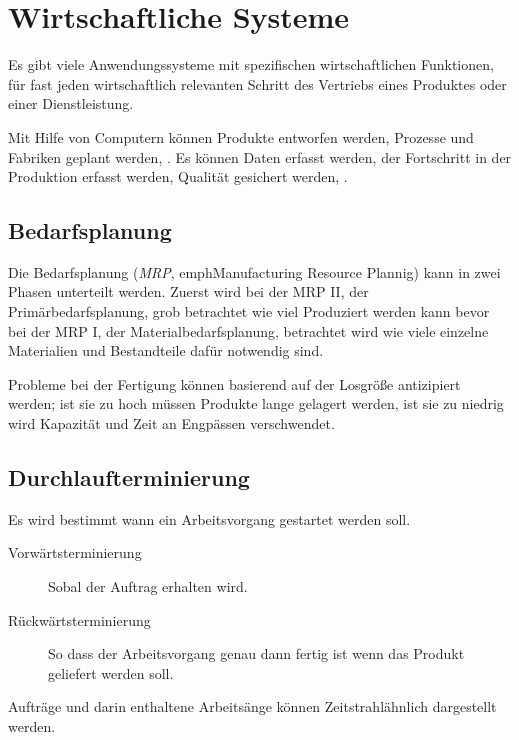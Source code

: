 \documentclass{article}
\begin{document}
\section{Wirtschaftliche Systeme} 
Es gibt viele Anwendungssysteme mit spezifischen wirtschaftlichen Funktionen, für fast jeden wirtschaftlich relevanten Schritt des Vertriebs eines Produktes oder einer Dienstleistung.

Mit Hilfe von Computern können Produkte entworfen werden, Prozesse und Fabriken geplant werden, \etc. Es können Daten erfasst werden, der Fortschritt in der Produktion erfasst werden, Qualität gesichert werden, \etc.

\subsection{Bedarfsplanung}
Die Bedarfsplanung (\emph{MRP}, emph{Manufacturing Resource Plannig}) kann in zwei Phasen unterteilt werden. Zuerst wird bei der MRP II, der Primärbedarfsplanung, grob betrachtet wie viel Produziert werden kann bevor bei der MRP I, der Materialbedarfsplanung, betrachtet wird wie viele einzelne Materialien und Bestandteile dafür notwendig sind.

Probleme bei der Fertigung können basierend auf der Losgröße antizipiert werden; ist sie zu hoch müssen Produkte lange gelagert werden, ist sie zu niedrig wird Kapazität und Zeit an Engpässen verschwendet.

\subsection{Durchlaufterminierung}
Es wird bestimmt wann ein Arbeitsvorgang gestartet werden soll.
\begin{description}
 \item[Vorwärtsterminierung] Sobal der Auftrag erhalten wird.
 \item[Rückwärtsterminierung] So dass der Arbeitsvorgang genau dann fertig ist wenn das Produkt geliefert werden soll.
\end{description}
Aufträge und darin enthaltene Arbeitsänge können Zeitstrahlähnlich dargestellt werden.
\end{document}
